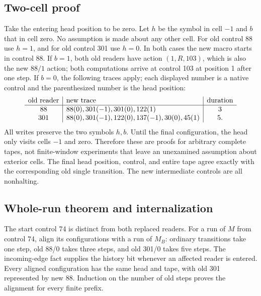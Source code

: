 \subsection{Two-cell proof}
Take the entering head position to be zero.  Let $h$ be the symbol in cell
$-1$ and $b$ that in cell zero.  No assumption is made about any other cell.
For old control 88 use $h=1$, and for old control 301 use $h=0$.  In both cases
the new macro starts in control 88.  If $b=1$, both old readers have action
$(1,R,103)$, which is also the new $88/1$ action; both computations arrive
at control 103 at position 1 after one step.
If $b=0$, the following traces apply; each displayed number is a native
control and the parenthesized number is the head position:
\[
\begin{array}{c|l|c}
\hbox{old reader}&\hbox{new trace}&\hbox{duration}\\\hline
88&88(0),301(-1),301(0),122(1)&3\\
301&88(0),301(-1),122(0),137(-1),30(0),45(1)&5.
\end{array}
\]
All writes preserve the two symbols $h,b$.  Until the final configuration,
the head only visits cells $-1$ and zero.  Therefore these are proofs for
arbitrary complete tapes, not finite-window experiments that leave an
unexamined assumption about exterior cells.  The final head position,
control, and entire tape agree exactly with the corresponding old single
transition.  The new intermediate controls are all nonhalting.

\subsection{Whole-run theorem and internalization}
The start control 74 is distinct from both replaced readers.  For a run of
$M$ from control 74, align its configurations with a run of $M_B$: ordinary
transitions take one step, old 88/0 takes three steps, and old 301/0 takes
five steps.  The incoming-edge fact supplies the history bit whenever an
affected reader is entered.  Every aligned configuration has the same
head and tape, with old 301 represented by new 88.  Induction on the number
of old steps proves the alignment for every finite prefix.

